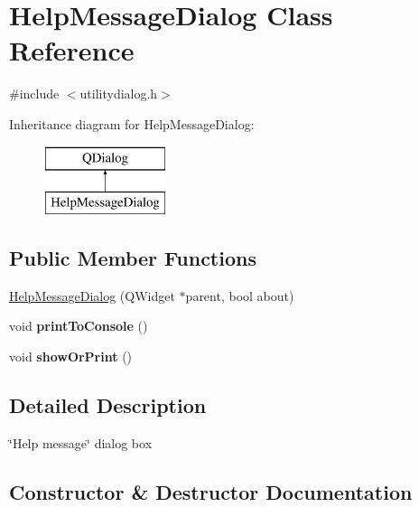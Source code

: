 \hypertarget{class_help_message_dialog}{}\section{Help\+Message\+Dialog Class Reference}
\label{class_help_message_dialog}


{\ttfamily \#include $<$utilitydialog.\+h$>$}

Inheritance diagram for Help\+Message\+Dialog\+:\begin{figure}[H]
\begin{center}
\leavevmode
\includegraphics[height=2.000000cm]{class_help_message_dialog}
\end{center}
\end{figure}
\subsection*{Public Member Functions}
\begin{DoxyCompactItemize}
\item 
\mbox{\hyperlink{class_help_message_dialog_a776ac4235e2a407223c7729d7d4af6a9}{Help\+Message\+Dialog}} (Q\+Widget $\ast$parent, bool about)
\item 
\mbox{\label{class_help_message_dialog_aca63e190e624f6fc6208196345d9c23f}} 
void {\bfseries print\+To\+Console} ()
\item 
\mbox{\label{class_help_message_dialog_ac0078c816ad197f6d27352c9591f3c34}} 
void {\bfseries show\+Or\+Print} ()
\end{DoxyCompactItemize}


\subsection{Detailed Description}
\char`\"{}\+Help message\char`\"{} dialog box 

\subsection{Constructor \& Destructor Documentation}
\mbox{\label{class_help_message_dialog_a776ac4235e2a407223c7729d7d4af6a9}} 
